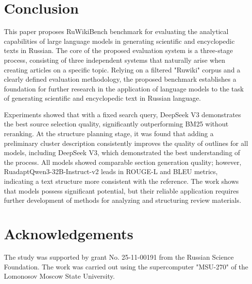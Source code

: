 \documentclass{superfri}
\begin{document}
\section*{Conclusion}
This paper proposes RuWikiBench benchmark for evaluating the analytical capabilities of large language models in generating scientific and encyclopedic texts in Russian. 
The core of the proposed evaluation system is a three-stage process, consisting of three independent systems that naturally arise when creating articles on a specific topic. 
Relying on a filtered "Ruwiki" corpus and a clearly defined evaluation methodology, the proposed benchmark establishes a foundation for further research in the application of language models to the 
task of generating scientific and encyclopedic text in Russian language.

Experiments showed that with a fixed search query, DeepSeek V3 demonstrates the best source selection quality, significantly outperforming BM25 without reranking. 
At the structure planning stage, it was found that adding a preliminary cluster description consistently improves the quality of outlines for all models, 
including DeepSeek V3, which demonstrated the best understanding of the process. All models showed comparable section generation quality; 
however, RuadaptQwen3-\allowbreak 32B-\allowbreak Instruct-\allowbreak v2 leads in ROUGE-L and BLEU metrics, indicating a text structure more consistent with the reference. 
The work shows that models possess significant potential, but their reliable application requires further development of methods for analyzing and structuring review materials.

\section*{Acknowledgements}
The study was supported by grant No. 25-11-00191 from the Russian Science Foundation.
The work was carried out using the supercomputer "MSU-270" of the Lomonosov Moscow State University.
\end{document}
